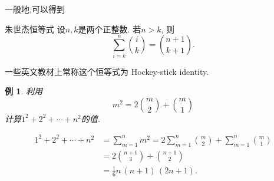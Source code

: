 \documentclass[punct]{ctexbeamer}
\newtheorem{ex}{例}[section]
\begin{document}
\begin{frame}
\begin{minipage}{0.3\linewidth}
\begin{figure}
	    \end{figure}
	\end{minipage}

	一般地,可以得到
	\begin{block}{朱世杰恒等式}
		设$n,k$是两个正整数.
		若$n>k$, 则
		$$\sum_{i=k}^{n}\binom{i}{k}=\binom{n+1}{k+1}.$$
	\end{block}

	一些英文教材上常称这个恒等式为 Hockey-stick identity.

\end{frame}




\begin{frame}
    \begin{ex}
        利用\[m^{2}=2\binom{m}{2}+\binom{m}{1} \]	计算$1^{2}+2^{2}+\cdots+n^{2}$的值.
    \end{ex}
    \pause
    \[
    \begin{aligned}
        1^{2}+2^{2}+\cdots+n^{2}
        &=\sum_{m=1}^{n}m^{2}
        =2\sum_{m=1}^{n}\binom{m}{2}+\sum_{m=1}^{n}\binom{m}{1}\\
        &=2\binom{n+1}{3}+\binom{n+1}{2}\\
        &=\frac{1}{6}n\, (n+1)\, (2n+1).
    \end{aligned}
    \]
\end{frame}
\end{document}
